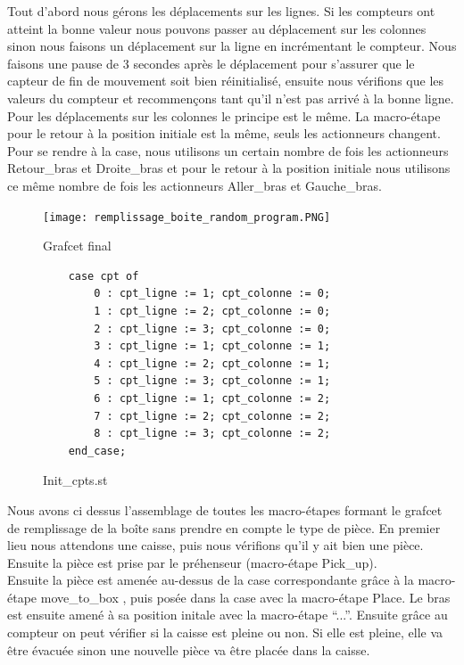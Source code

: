 \documentclass[oneside,a4paper,12pt]{article}
\begin{document}
			Tout d’abord nous gérons les déplacements sur les lignes. Si les compteurs ont atteint la bonne valeur nous pouvons passer au déplacement sur les colonnes sinon nous faisons un déplacement sur la ligne en incrémentant le compteur. Nous faisons une pause de 3 secondes après le déplacement pour s’assurer que le capteur de fin de mouvement soit bien réinitialisé, ensuite nous vérifions que les valeurs du compteur et recommençons tant qu’il n’est pas arrivé à la bonne ligne. Pour les déplacements sur les colonnes le principe est le même. La macro-étape pour le retour à la position initiale est la même, seuls les actionneurs changent. Pour se rendre à la case, nous utilisons un certain nombre de fois les actionneurs Retour\_bras et Droite\_bras et pour le retour à la position initiale nous utilisons ce même nombre de fois les actionneurs Aller\_bras et Gauche\_bras.\newpage

			

			\begin{figure}[h]
				\centering
				\texttt{[image: remplissage\_boite\_random\_program.PNG]}
				\caption{Grafcet final}
			\end{figure}
			\begin{figure}
				\centering
				\begin{lstlisting}	
	case cpt of
		0 : cpt_ligne := 1; cpt_colonne := 0;
		1 : cpt_ligne := 2; cpt_colonne := 0;
		2 : cpt_ligne := 3; cpt_colonne := 0;
		3 : cpt_ligne := 1; cpt_colonne := 1;
		4 : cpt_ligne := 2; cpt_colonne := 1;
		5 : cpt_ligne := 3; cpt_colonne := 1;
		6 : cpt_ligne := 1; cpt_colonne := 2;
		7 : cpt_ligne := 2; cpt_colonne := 2;
		8 : cpt_ligne := 3; cpt_colonne := 2;
	end_case;
				\end{lstlisting}
				\caption{Init\_cpts.st}
			\end{figure}
		
			Nous avons ci dessus l’assemblage de toutes les macro-étapes formant le grafcet de remplissage de la boîte sans prendre en compte le type de pièce. En premier lieu nous attendons une caisse, puis nous vérifions qu’il y ait bien une pièce. Ensuite la pièce est prise par le préhenseur (macro-étape Pick\_up).\\
			
			Ensuite la pièce est amenée au-dessus de la case correspondante grâce à la macro-étape move\_to\_box , puis posée dans la case avec la macro-étape Place. Le bras est ensuite amené à sa position initale avec la macro-étape “...”. Ensuite grâce au compteur on peut vérifier si la caisse est pleine ou non. Si elle est pleine, elle va être évacuée sinon une nouvelle pièce va être placée dans la caisse.
			
\end{document}
